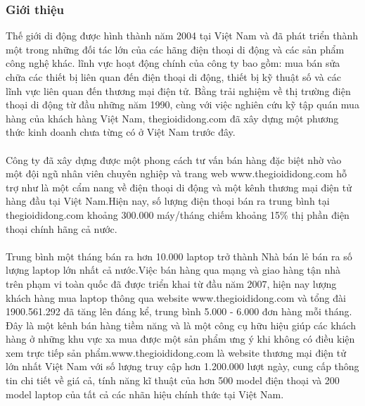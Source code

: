 \subsubsection{Giới thiệu}
Thế giới di động được hình thành năm 2004 tại Việt Nam và đã phát triển thành một trong những đối tác lớn của các hãng điện thoại di động và các sản phẩm công nghệ khác. lĩnh vực hoạt động chính của công ty bao gồm: mua bán sửa chữa các thiết bị liên quan đến điện thoại di động, thiết bị kỹ thuật số và các lĩnh vực liên quan đến thương mại điện tử.
Bằng trải nghiệm về thị trường điện thoại di động từ đầu những năm 1990, cùng với việc nghiên cứu kỹ tập quán mua hàng của khách hàng Việt Nam, thegioididong.com đã xây dựng một phương thức kinh doanh chưa từng có ở Việt Nam trước đây. \\
\\
Công ty đã xây dựng được một phong cách tư vấn bán hàng đặc biệt nhờ vào một đội ngũ nhân viên chuyên nghiệp và trang web www.thegioididong.com hỗ trợ như là một cẩm nang về điện thoại di động và một kênh thương mại điện tử hàng đầu tại Việt Nam.Hiện nay, số lượng điện thoại bán ra trung bình tại thegioididong.com khoảng 300.000 máy/tháng chiếm khoảng 15\% thị phần điện thoại chính hãng cả nước.\\
\\
Trung bình một tháng bán ra hơn 10.000 laptop trở thành Nhà bán lẻ bán ra số lượng laptop lớn nhất cả nước.Việc bán hàng qua mạng và giao hàng tận nhà trên phạm vi toàn quốc đã được triển khai từ đầu năm 2007, hiện nay lượng khách hàng mua laptop thông qua website www.thegioididong.com và tổng đài 1900.561.292 đã tăng lên đáng kể, trung bình 5.000 - 6.000 đơn hàng mỗi tháng. Đây là một kênh bán hàng tiềm năng và là một công cụ hữu hiệu giúp các khách hàng ở những khu vực xa mua được một sản phẩm ưng ý khi không có điều kiện xem trực tiếp sản phẩm.www.thegioididong.com là website thương mại điện tử lớn nhất Việt Nam với số lượng truy cập hơn 1.200.000 lượt ngày, cung cấp thông tin chi tiết về giá cả, tính năng kĩ thuật của hơn 500 model điện thoại và 200 model laptop của tất cả các nhãn hiệu chính thức tại Việt Nam.

